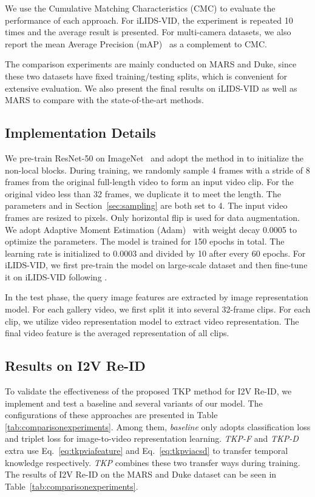 \documentclass[10pt,twocolumn,letterpaper]{article}
\begin{document}
We use the Cumulative Matching Characteristics (CMC) to evaluate the performance of each approach. 
For iLIDS-VID, the experiment is repeated 10 times and the average result is presented. 
For multi-camera datasets, we also report the mean Average Precision (mAP)~\cite{Zheng2015Scalable} as a complement to CMC.

The comparison experiments are mainly conducted on MARS and Duke, since these two datasets have fixed training/testing splits, which is convenient for extensive evaluation.
We also present the final results on iLIDS-VID as well as MARS to compare with the state-of-the-art methods.



\subsection{Implementation Details}

We pre-train ResNet-50 on ImageNet~\cite{Olga2015ImageNet} and adopt the method in \cite{Wang2018Non} to initialize the non-local blocks.
During training, we randomly sample 4 frames with a stride of 8 frames from the original full-length video to form an input video clip.
For the original video less than 32 frames, we duplicate it to meet the length.
The parameters  and  in Section~\ref{sec:sampling} are both set to 4.
The input video frames are resized to  pixels.
Only horizontal flip is used for data augmentation. 
We adopt Adaptive Moment Estimation (Adam)~\cite{Kingma2014Adam} with weight decay 0.0005 to optimize the parameters. 
The model is trained for 150 epochs in total.
The learning rate is initialized to 0.0003 and divided by 10 after every 60 epochs.
For iLIDS-VID, we first pre-train the model on large-scale dataset and then fine-tune it on iLIDS-VID following \cite{Wang2017P2SNet}.

In the test phase, the query image features are extracted by image representation model. 
For each gallery video, we first split it into several 32-frame clips. 
For each clip, we utilize video representation model to extract video representation. 
The final video feature is the averaged representation of all clips.



\subsection{Results on I2V Re-ID}
\label{sec:resultsonI2VRe-ID}

To validate the effectiveness of the proposed TKP method for I2V Re-ID, we implement and test a baseline and several variants of our model. 
The configurations of these approaches are presented in Table \ref{tab:comparisonexperiments}.
Among them, \textit{baseline} only adopts classification loss and triplet loss for image-to-video representation learning.
\textit{TKP-F} and \textit{TKP-D} extra use Eq.~\eqref{eq:tkpviafeature} and Eq.~\eqref{eq:tkpviacsd} to transfer temporal knowledge respectively.
\textit{TKP} combines these two transfer ways during training.
The results of I2V Re-ID on the MARS and Duke dataset can be seen in Table~\ref{tab:comparisonexperiments}.
\end{document}
